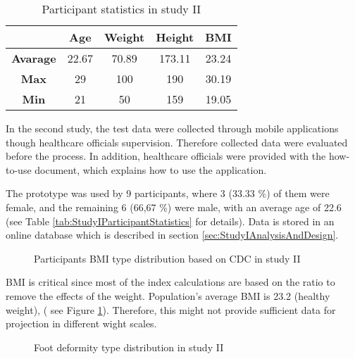 \begin{table}[htbp]
\begin{center}
\caption{Participant statistics in study II}
\vspace{23pt}
      \begin{tabular}{|c|c|c|c|c|} \hline
          & \textbf{Age} & \textbf{Weight} & \textbf{Height} & \textbf{BMI} \\ \hline
        \textbf{Avarage} & 22.67 & 70.89 & 173.11 & 23.24 \\ \hline
        \textbf{Max} & 29 & 100 & 190 & 30.19 \\ \hline
        \textbf{Min} & 21 & 50 & 159 & 19.05 \\ \hline
    \end{tabular}
\label{tab:StudyIIParticipantStatistics}
\end{center}
\end{table}

In the second study, the test data were collected through mobile applications though healthcare officials supervision. Therefore collected data were evaluated before the process. In addition, healthcare officials were provided with the how-to-use document, which explains how to use the application. 

The prototype was used by 9 participants, where 3 (33.33 \%) of them were female, and the remaining 6 (66,67 \%) were male, with an average age of 22.6 (see Table \ref{tab:StudyIParticipantStatistics} for details). Data is stored in an online database which is described in section \ref{sec:StudyIAnalysisAndDesign}. 

\begin{figure}[htbp]
\centering
{}
\caption{Participants BMI type distribution based on CDC in study II}
\label{fig:StudyIIParticipantsBMITypeDistribution}
\end{figure}

BMI is critical since most of the index calculations are based on the ratio to remove the effects of the weight. Population's average BMI is 23.2 (healthy weight), ( see Figure \ref{fig:StudyIIParticipantsBMITypeDistribution}). Therefore, this might not provide sufficient data for projection in different wight scales.

\begin{figure}[htbp]
\centering
{}
\caption{Foot deformity type distribution in study II}
\label{fig:StudyIIFootDeformityTypeDistribution}
\end{figure} 

